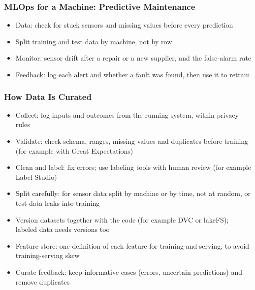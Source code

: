 \begin{frame}[fragile]\frametitle{MLOps for a Machine: Predictive Maintenance}
\begin{center}
\end{center}
\begin{itemize}
\item Data: check for stuck sensors and missing values before every prediction
\item Split training and test data by machine, not by row
\item Monitor: sensor drift after a repair or a new supplier, and the false-alarm rate
\item Feedback: log each alert and whether a fault was found, then use it to retrain
\end{itemize}
\end{frame}

\begin{frame}[fragile]\frametitle{How Data Is Curated}
\begin{itemize}
\item Collect: log inputs and outcomes from the running system, within privacy rules
\item Validate: check schema, ranges, missing values and duplicates before training (for example with Great Expectations)
\item Clean and label: fix errors; use labeling tools with human review (for example Label Studio)
\item Split carefully: for sensor data split by machine or by time, not at random, or test data leaks into training
\item Version datasets together with the code (for example DVC or lakeFS); labeled data needs versions too
\item Feature store: one definition of each feature for training and serving, to avoid training-serving skew
\item Curate feedback: keep informative cases (errors, uncertain predictions) and remove duplicates
\end{itemize}
\end{frame}

